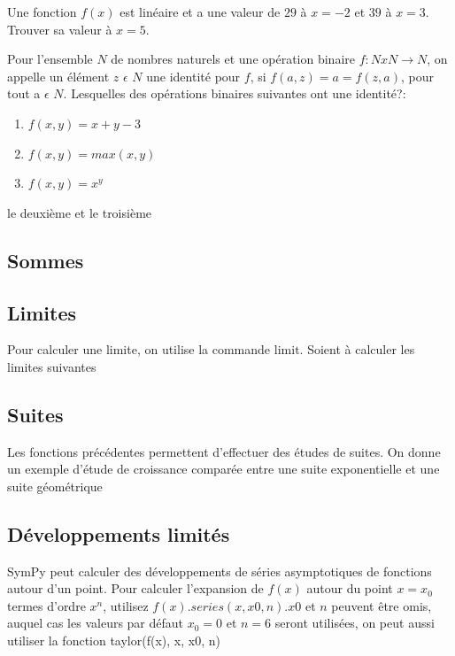 \begin{exercise}
Une fonction $f (x)$ est lin\'eaire et a une valeur de $29$ \`a $x = -2$ et $39$ à $x = 3$. Trouver sa valeur à $x = 5$.
\end{exercise}

\begin{exercise}
Pour l'ensemble $N$ de nombres naturels et une opération binaire $f: N x N \longrightarrow N$, on appelle un élément $z$ $\epsilon$ $N$ une identité pour $f$, si $f (a, z) = a = f (z, a)$, pour tout a $\epsilon$ $N$. Lesquelles des opérations binaires suivantes ont une identité?:
\begin{enumerate}
  \item $f (x, y) = x + y - 3$
  \item $f (x, y) = max(x, y)$
  \item $f (x, y) = x^{y}$
\end{enumerate}
\end{exercise}
\begin{solution}
le deuxième et le troisième 
\end{solution}
 \subsection{Sommes}
 \subsection{Limites}
Pour calculer une limite, on utilise la commande $\mathrm{limit}$. Soient à calculer les limites suivantes
 \subsection{Suites}
 Les fonctions précédentes permettent d’effectuer des études de suites. On donne un exemple d’étude de croissance comparée entre une suite exponentielle et une suite géométrique
 \subsection{Développements limités}
 SymPy peut calculer des développements de séries asymptotiques de fonctions autour d'un point. Pour calculer 
 l'expansion de $f(x)$ autour du point $x = x_{0}$ termes d'ordre $x^{n}$, utilisez $f(x).series(x, x0, n). x0$ 
 et $n$ peuvent être omis, auquel cas les valeurs par défaut $x_{0} = 0$ et $n = 6$ seront utilisées, on peut 
 aussi utiliser la fonction taylor(f(x), x, x0, n)

